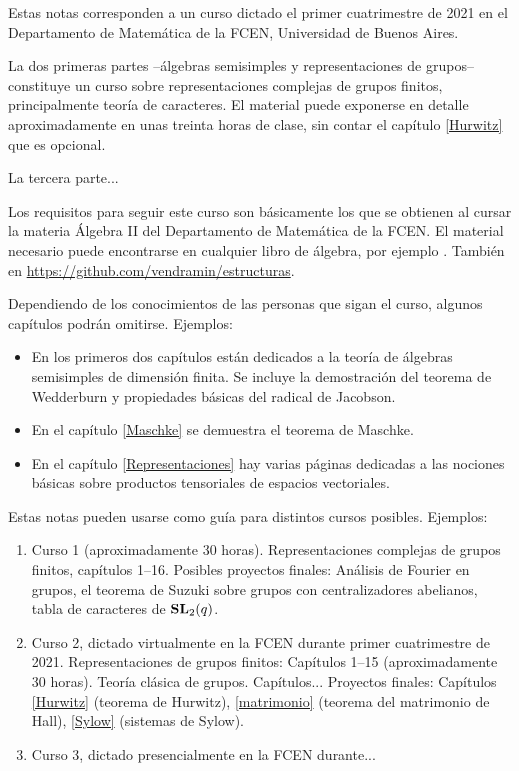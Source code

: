 \preface

Estas notas corresponden a un curso dictado el primer cuatrimestre de 2021 en 
el Departamento de Matemática de la FCEN, Universidad de Buenos Aires. 

La dos primeras partes --álgebras semisimples y representaciones de grupos-- 
constituye un curso sobre representaciones complejas 
de grupos finitos, principalmente teoría de caracteres. El material 
puede exponerse en detalle aproximadamente en unas treinta horas 
de clase, sin contar el capítulo \ref{Hurwitz}  
que es opcional. 

La tercera parte...



Los requisitos para seguir este curso son básicamente los
que se obtienen al cursar la materia Álgebra II del 
Departamento de Matemática de la FCEN. El material 
necesario puede encontrarse en cualquier libro de álgebra, por ejemplo \cite{MR600654}.
También en \url{https://github.com/vendramin/estructuras}.

Dependiendo
de los conocimientos de las personas que sigan el curso, 
algunos capítulos podrán omitirse. Ejemplos: 

\begin{itemize}
    \item En los primeros dos capítulos están dedicados a la teoría de álgebras semisimples de dimensión finita. Se incluye la demostración del teorema de Wedderburn y propiedades básicas del radical de Jacobson. 
    \item En el capítulo \ref{Maschke} se demuestra el teorema de Maschke. 
    \item En el capítulo \ref{Representaciones} hay varias páginas dedicadas a las nociones básicas sobre
    productos tensoriales de espacios vectoriales. 
\end{itemize}

Estas notas pueden usarse como guía para distintos cursos posibles. 
Ejemplos:  
\begin{enumerate}
    \item Curso 1 (aproximadamente 30 horas). 
    Representaciones complejas de grupos finitos, capítulos 1--16. 
    Posibles proyectos finales: Análisis de Fourier en grupos, 
    el teorema de Suzuki sobre grupos con centralizadores abelianos, tabla de caracteres de
    $\mathbf{SL}_2(q)$. 
    \item Curso 2, dictado virtualmente en la FCEN durante primer cuatrimestre de 2021. 
    Representaciones de grupos finitos: Capítulos 1--15 (aproximadamente 30 horas). 
    Teoría clásica de grupos. Capítulos... Proyectos finales: Capítulos \ref{Hurwitz} (teorema de Hurwitz), 
    \ref{matrimonio} (teorema del matrimonio de Hall), 
    \ref{Sylow} (sistemas de Sylow).
    \item Curso 3, dictado presencialmente en la FCEN durante... 
\end{enumerate}



